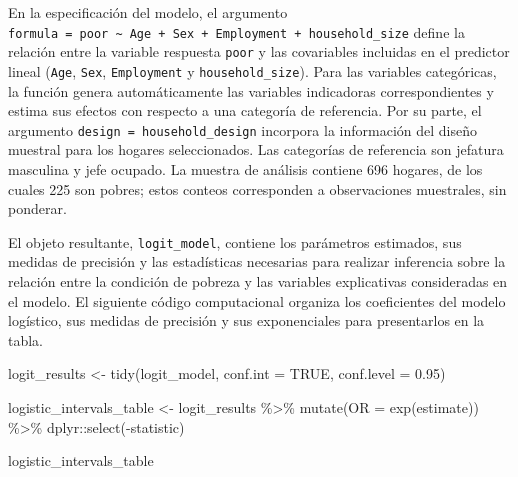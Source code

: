 \documentclass[
  spanish,
  11pt,
  letterpaper,
  oneside,
  open=any]{scrbook}
\newenvironment{Shaded}{\begin{snugshade}}{\end{snugshade}}
\newcommand{\AttributeTok}[1]{\textcolor[rgb]{0.40,0.45,0.13}{#1}}
\newcommand{\ConstantTok}[1]{\textcolor[rgb]{0.56,0.35,0.01}{#1}}
\newcommand{\FloatTok}[1]{\textcolor[rgb]{0.68,0.00,0.00}{#1}}
\newcommand{\FunctionTok}[1]{\textcolor[rgb]{0.28,0.35,0.67}{#1}}
\newcommand{\NormalTok}[1]{\textcolor[rgb]{0.00,0.23,0.31}{#1}}
\newcommand{\OtherTok}[1]{\textcolor[rgb]{0.00,0.23,0.31}{#1}}
\newcommand{\SpecialCharTok}[1]{\textcolor[rgb]{0.37,0.37,0.37}{#1}}
\begin{document}
En la especificación del modelo, el argumento
\texttt{formula\ =\ poor\ \textasciitilde{}\ Age\ +\ Sex\ +\ Employment\ +\ household\_size}
define la relación entre la variable respuesta \texttt{poor} y las
covariables incluidas en el predictor lineal (\texttt{Age},
\texttt{Sex}, \texttt{Employment} y \texttt{household\_size}). Para las
variables categóricas, la función genera automáticamente las variables
indicadoras correspondientes y estima sus efectos con respecto a una
categoría de referencia. Por su parte, el argumento
\texttt{design\ =\ household\_design} incorpora la información del
diseño muestral para los hogares seleccionados. Las categorías de
referencia son jefatura masculina y jefe ocupado. La muestra de análisis
contiene 696 hogares, de los cuales 225 son pobres; estos conteos
corresponden a observaciones muestrales, sin ponderar.

El objeto resultante, \texttt{logit\_model}, contiene los parámetros
estimados, sus medidas de precisión y las estadísticas necesarias para
realizar inferencia sobre la relación entre la condición de pobreza y
las variables explicativas consideradas en el modelo. El siguiente
código computacional organiza los coeficientes del modelo logístico, sus
medidas de precisión y sus exponenciales para presentarlos en la tabla.

\begin{Shaded}
\begin{Highlighting}[]
\NormalTok{logit\_results }\OtherTok{\textless{}{-}} \FunctionTok{tidy}\NormalTok{(logit\_model, }\AttributeTok{conf.int =} \ConstantTok{TRUE}\NormalTok{, }\AttributeTok{conf.level =} \FloatTok{0.95}\NormalTok{)}

\NormalTok{logistic\_intervals\_table }\OtherTok{\textless{}{-}}\NormalTok{ logit\_results }\SpecialCharTok{\%\textgreater{}\%}
  \FunctionTok{mutate}\NormalTok{(}\AttributeTok{OR =} \FunctionTok{exp}\NormalTok{(estimate)) }\SpecialCharTok{\%\textgreater{}\%}
\NormalTok{  dplyr}\SpecialCharTok{::}\FunctionTok{select}\NormalTok{(}\SpecialCharTok{{-}}\NormalTok{statistic)}

\NormalTok{logistic\_intervals\_table}
\end{Highlighting}
\end{Shaded}
\end{document}
